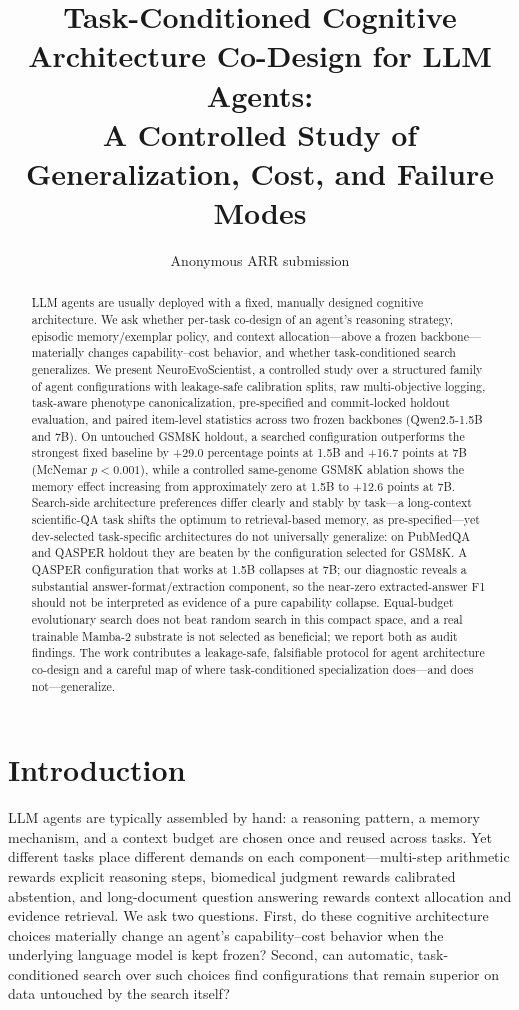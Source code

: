 \documentclass[11pt]{article}
\title{Task-Conditioned Cognitive Architecture Co-Design for LLM Agents:\\
A Controlled Study of Generalization, Cost, and Failure Modes}
\author{Anonymous ARR submission}
\date{}
\begin{document}
\maketitle

\begin{abstract}
LLM agents are usually deployed with a fixed, manually designed cognitive
architecture. We ask whether per-task co-design of an agent's reasoning
strategy, episodic memory/exemplar policy, and context allocation---above a
frozen backbone---materially changes capability--cost behavior, and whether
task-conditioned search generalizes. We present NeuroEvoScientist, a
controlled study over a structured family of agent configurations with
leakage-safe calibration splits, raw multi-objective logging, task-aware
phenotype canonicalization, pre-specified and commit-locked holdout
evaluation, and paired item-level statistics across two frozen backbones
(Qwen2.5-1.5B and 7B). On untouched GSM8K holdout, a searched configuration
outperforms the strongest fixed baseline by +29.0 percentage points at 1.5B
and +16.7 points at 7B (McNemar $p<0.001$), while a controlled same-genome
GSM8K ablation shows the memory effect increasing from approximately zero at
1.5B to +12.6 points at 7B. Search-side architecture preferences differ
clearly and stably by task---a long-context scientific-QA task shifts the
optimum to retrieval-based memory, as pre-specified---yet dev-selected
task-specific architectures do not universally generalize: on PubMedQA and
QASPER holdout they are beaten by the configuration selected for GSM8K. A
QASPER configuration that works at 1.5B collapses at 7B; our diagnostic
reveals a substantial answer-format/extraction component, so the near-zero
extracted-answer F1 should not be interpreted as evidence of a pure
capability collapse. Equal-budget evolutionary search does not beat random
search in this compact space, and a real trainable Mamba-2 substrate is not
selected as beneficial; we report both as audit findings. The work
contributes a leakage-safe, falsifiable protocol for agent architecture
co-design and a careful map of where task-conditioned specialization
does---and does not---generalize.
\end{abstract}

\section{Introduction}

LLM agents are typically assembled by hand: a reasoning pattern, a memory
mechanism, and a context budget are chosen once and reused across tasks. Yet
different tasks place different demands on each component---multi-step
arithmetic rewards explicit reasoning steps, biomedical judgment rewards
calibrated abstention, and long-document question answering rewards context
allocation and evidence retrieval. We ask two questions. First, do these
cognitive architecture choices materially change an agent's capability--cost
behavior when the underlying language model is kept frozen? Second, can
automatic, task-conditioned search over such choices find configurations
that remain superior on data untouched by the search itself?
\end{document}
